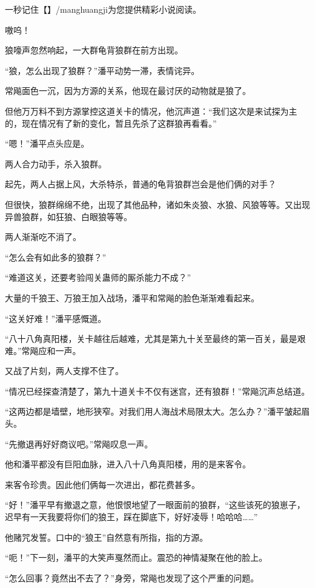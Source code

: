 
\begin{this_body}

一秒记住【】/manghuangji为您提供精彩小说阅读。

嗷呜！

狼嚎声忽然响起，一大群龟背狼群在前方出现。

“狼，怎么出现了狼群？”潘平动势一滞，表情诧异。

常飚面色一沉，因为方源的关系，他现在最讨厌的动物就是狼了。

但他万万料不到方源掌控这道关卡的情况，他沉声道：“我们这次是来试探为主的，现在情况有了新的变化，暂且先杀了这群狼再看看。”

“嗯！”潘平点头应是。

两人合力动手，杀入狼群。

起先，两人占据上风，大杀特杀，普通的龟背狼群岂会是他们俩的对手？

但很快，狼群绵绵不绝，出现了其他品种，诸如朱炎狼、水狼、风狼等等。又出现异兽狼群，如狂狼、白眼狼等等。

两人渐渐吃不消了。

“怎么会有如此多的狼群？”

“难道这关，还要考验闯关蛊师的厮杀能力不成？”

大量的千狼王、万狼王加入战场，潘平和常飚的脸色渐渐难看起来。

“这关好难！”潘平感慨道。

“八十八角真阳楼，关卡越往后越难，尤其是第九十关至最终的第一百关，最是艰难。”常飚应和一声。

又战了片刻，两人支撑不住了。

“情况已经探查清楚了，第九十道关卡不仅有迷宫，还有狼群！”常飚沉声总结道。

“这两边都是墙壁，地形狭窄。对我们用人海战术局限太大。怎么办？”潘平皱起眉头。

“先撤退再好好商议吧。”常飚叹息一声。

他和潘平都没有巨阳血脉，进入八十八角真阳楼，用的是来客令。

来客令珍贵。因此他们俩每一次进出，都花费甚多。

“好！”潘平早有撤退之意，他恨恨地望了一眼面前的狼群，“这些该死的狼崽子，迟早有一天我要将你们的狼王，踩在脚底下，好好凌辱！哈哈哈……”

他赌咒发誓。口中的“狼王”自然意有所指，指的方源。

“呃！”下一刻，潘平的大笑声戛然而止。震恐的神情凝聚在他的脸上。

“怎么回事？竟然出不去了？”身旁，常飚也发现了这个严重的问题。


\end{this_body}

